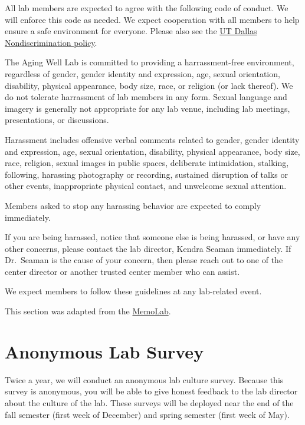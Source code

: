\documentclass[
]{book}
\begin{document}
All lab members are expected to agree with the following code of conduct. We will enforce this code as needed. We expect cooperation with all members to help ensure a safe environment for everyone. Please also see the \href{https://policy.utdallas.edu/utdbp3090}{UT Dallas Nondiscrimination policy}.

The Aging Well Lab is committed to providing a harrassment-free environment, regardless of gender, gender identity and expression, age, sexual orientation, disability, physical appearance, body size, race, or religion (or lack thereof). We do not tolerate harrassment of lab members in any form. Sexual language and imagery is generally not appropriate for any lab venue, including lab meetings, presentations, or discussions.

Harassment includes offensive verbal comments related to gender, gender identity and expression, age, sexual orientation, disability, physical appearance, body size, race, religion, sexual images in public spaces, deliberate intimidation, stalking, following, harassing photography or recording, sustained disruption of talks or other events, inappropriate physical contact, and unwelcome sexual attention.

Members asked to stop any harassing behavior are expected to comply immediately.

If you are being harassed, notice that someone else is being harassed, or have any other concerns, please contact the lab director, Kendra Seaman immediately. If Dr.~Seaman is the cause of your concern, then please reach out to one of the center director or another trusted center member who can assist.

We expect members to follow these guidelines at any lab-related event.

This section was adapted from the \href{https://github.com/memobc/memolab-manual\#code-of-conduct}{MemoLab}.

\hypertarget{anonymous-lab-survey}{%
\section{Anonymous Lab Survey}\label{anonymous-lab-survey}}

Twice a year, we will conduct an anonymous lab culture survey. Because this survey is anonymous, you will be able to give honest feedback to the lab director about the culture of the lab. These surveys will be deployed near the end of the fall semester (first week of December) and spring semester (first week of May).
\end{document}
